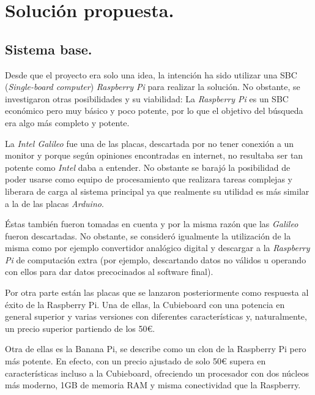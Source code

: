 \section{Solución propuesta.}

\subsection{Sistema base.}
Desde que el proyecto era solo una idea, la intención ha sido utilizar una SBC (\emph{Single-board computer}) \emph{Raspberry Pi} para realizar la solución. No obstante, se investigaron otras posibilidades y su viabilidad: La \emph{Raspberry Pi} es un SBC económico pero muy básico y poco potente, por lo que el objetivo del búsqueda era algo más completo y potente. 

La \emph{Intel Galileo} fue una de las placas, descartada por no tener conexión a un monitor y porque según opiniones encontradas en internet, no resultaba ser tan potente como \emph{Intel} daba a entender. No obstante se barajó la posibilidad de poder usarse como equipo de procesamiento que realizara tareas complejas y liberara de carga al sistema principal ya que realmente su utilidad es más similar a la de las placas \emph{Arduino}. 

Éstas también fueron tomadas en cuenta y por la misma razón que las \emph{Galileo} fueron descartadas. No obstante, se consideró igualmente la utilización de la misma como por ejemplo convertidor analógico digital y descargar a la \emph{Raspberry Pi} de computación extra (por ejemplo, descartando datos no válidos u operando con ellos para dar datos precocinados al software final).

Por otra parte están las placas que se lanzaron posteriormente como respuesta al éxito de la Raspberry Pi. Una de ellas, la Cubieboard con una potencia en general superior y varias versiones con diferentes características y, naturalmente, un precio superior partiendo de los 50€.

Otra de ellas es la Banana Pi, se describe como un clon de la Raspberry Pi pero más potente. En efecto, con un precio ajustado de solo 50€ supera en características incluso a la Cubieboard, ofreciendo un procesador con dos núcleos más moderno, 1GB de memoria RAM y misma conectividad que la Raspberry.


